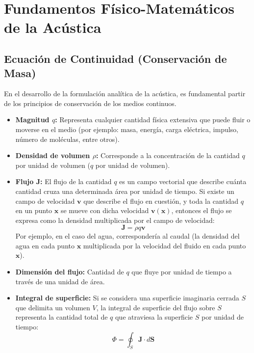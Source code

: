 \documentclass[11pt,letterpaper]{article}
\begin{document}
\section{Fundamentos Físico-Matemáticos de la Acústica}\label{sec:marco-teorico}

\subsection{Ecuación de Continuidad (Conservación de Masa)}

En el desarrollo de la formulación analítica de la acústica, es fundamental partir de los principios de conservación de los medios continuos. 

\begin{itemize}
    \item \textbf{Magnitud $q$:} Representa cualquier cantidad física extensiva que puede fluir o moverse en el medio (por ejemplo: masa, energía, carga eléctrica, impulso, número de moléculas, entre otros).
    \item \textbf{Densidad de volumen $\rho$:} Corresponde a la concentración de la cantidad $q$ por unidad de volumen ($q$ por unidad de volumen).
    \item \textbf{Flujo $\mathbf{J}$:} El flujo de la cantidad $q$ es un campo vectorial que describe cuánta cantidad cruza una determinada área por unidad de tiempo. Si existe un campo de velocidad $\mathbf{v}$ que describe el flujo en cuestión, y toda la cantidad $q$ en un punto $\mathbf{x}$ se mueve con dicha velocidad $\mathbf{v}(\mathbf{x})$, entonces el flujo se expresa como la densidad multiplicada por el campo de velocidad:
    \begin{equation}
        \mathbf{J} = \rho q \mathbf{v}
    \end{equation}
    Por ejemplo, en el caso del agua, correspondería al caudal (la densidad del agua en cada punto $\mathbf{x}$ multiplicada por la velocidad del fluido en cada punto $\mathbf{x}$).
    \item \textbf{Dimensión del flujo:} Cantidad de $q$ que fluye por unidad de tiempo a través de una unidad de área.
    \item \textbf{Integral de superficie:} Si se considera una superficie imaginaria cerrada $S$ que delimita un volumen $V$, la integral de superficie del flujo sobre $S$ representa la cantidad total de $q$ que atraviesa la superficie $S$ por unidad de tiempo:
    \begin{equation}
        \Phi = \oint_S \mathbf{J} \cdot d\mathbf{S}

\end{equation}
\end{itemize}
\end{document}
